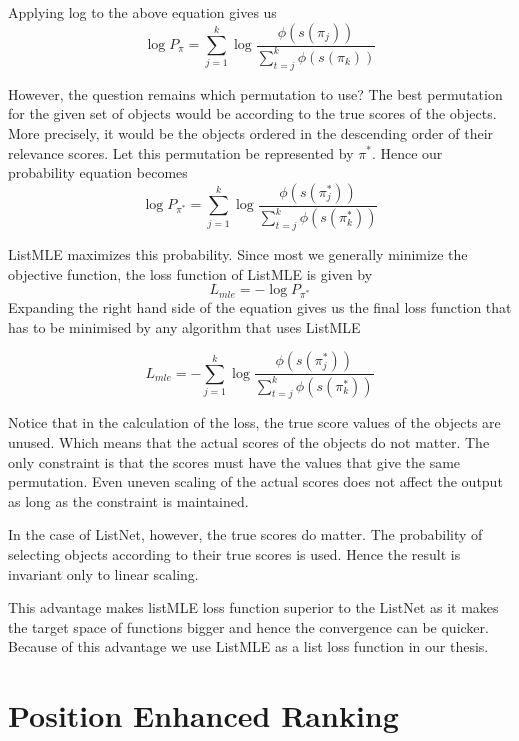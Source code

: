 \documentclass[12pt, twoside, ngerman]{report}
\begin{document}
Applying log to the above equation gives us
\begin{equation}
\log P_{\pi} = \sum\limits_{j=1}^{k} \log \frac{\phi(s(\pi_j))}{ \sum\limits_{t=j}^k \phi(s(\pi_k))}
\end{equation}

However,  the question remains which permutation to use?
The best permutation for the given set of objects would be according to the true scores of the objects.
More precisely,  it would be the objects ordered in the descending order of their relevance scores.
Let this permutation be represented by $\pi^*$.
Hence our probability equation becomes
\begin{equation}
\log P_{\pi^*} = \sum\limits_{j=1}^{k} \log \frac{\phi(s(\pi^*_j))}{ \sum\limits_{t=j}^k \phi(s(\pi^*_k))}
\end{equation}

ListMLE maximizes this probability.
Since most we generally minimize the objective function,  the loss function of ListMLE is given by
\begin{equation}
L_{mle} = - \log P_{\pi^*}
\end{equation}
Expanding the right hand side of the equation gives us the final loss function that has to be minimised by any algorithm that uses ListMLE

\begin{equation}
L_{mle} = -  \sum\limits_{j=1}^{k} \log \frac{\phi(s(\pi^*_j))}{ \sum\limits_{t=j}^k \phi(s(\pi^*_k))}
\end{equation}


Notice that in the calculation of the loss, the true score values of the objects are unused.
Which means that the actual scores of the objects do not matter.
The only constraint is that the scores must have the values that give the same permutation.
Even uneven scaling of the actual scores does not affect the output as long as the constraint is maintained.

In the case of ListNet,  however,  the true scores do matter.
The probability of selecting objects according to their true scores is used.
Hence the result is invariant only to linear scaling.

This advantage makes listMLE loss function superior to the ListNet as it makes the target space of functions bigger and hence the convergence can be quicker.
Because of this advantage we use ListMLE as a list loss function in our thesis.

\section{Position Enhanced Ranking}\label{sec:positionEnhancedRanking}
\end{document}
